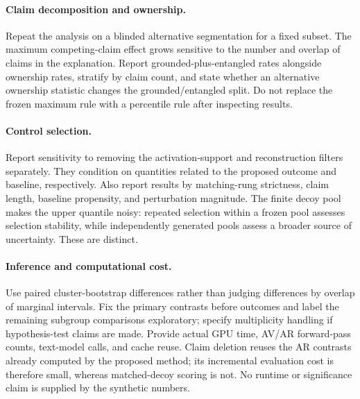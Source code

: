 \paragraph{Claim decomposition and ownership.}
Repeat the analysis on a blinded alternative segmentation for a fixed subset.
The maximum competing-claim effect grows sensitive to the number and overlap
of claims in the explanation. Report grounded-plus-entangled rates alongside
ownership rates, stratify by claim count, and state whether an alternative
ownership statistic changes the grounded/entangled split. Do not replace the
frozen maximum rule with a percentile rule after inspecting results.

\paragraph{Control selection.}
Report sensitivity to removing the activation-support and reconstruction
filters separately. They condition on quantities related to the proposed
outcome and baseline, respectively. Also report results by matching-rung
strictness, claim length, baseline propensity, and perturbation magnitude.
The finite decoy pool makes the upper quantile noisy: repeated selection
within a frozen pool assesses selection stability, while independently
generated pools assess a broader source of uncertainty. These are distinct.

\paragraph{Inference and computational cost.}
Use paired cluster-bootstrap differences rather than judging differences by
overlap of marginal intervals. Fix the primary contrasts before outcomes and
label the remaining subgroup comparisons exploratory; specify multiplicity
handling if hypothesis-test claims are made. Provide actual GPU time, AV/AR
forward-pass counts, text-model calls, and cache reuse. Claim deletion reuses
the AR contrasts already computed by the proposed method; its incremental
evaluation cost is therefore small, whereas matched-decoy scoring is not.
No runtime or significance claim is supplied by the synthetic numbers.
